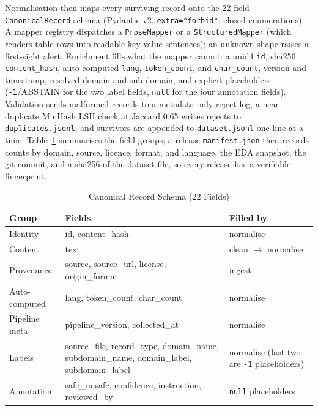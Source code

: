 \documentclass[conference]{IEEEtran}
\begin{document}
Normalisation then maps every surviving record onto the 22-field
\texttt{CanonicalRecord} schema (Pydantic v2, \texttt{extra="forbid"},
closed enumerations). A mapper registry dispatches a \texttt{ProseMapper}
or a \texttt{StructuredMapper} (which renders table rows into readable
key-value sentences); an unknown shape raises a first-sight alert.
Enrichment fills what the mapper cannot: a uuid4 \texttt{id}, sha256
\texttt{content\_hash}, auto-computed \texttt{lang}, \texttt{token\_count},
and \texttt{char\_count}, version and timestamp, resolved domain and
sub-domain, and explicit placeholders (\texttt{-1}/ABSTAIN for the two
label fields, \texttt{null} for the four annotation fields). Validation
sends malformed records to a metadata-only reject log, a near-duplicate
MinHash LSH check at Jaccard 0.65 writes rejects to
\texttt{duplicates.jsonl}, and survivors are appended to
\texttt{dataset.jsonl} one line at a time. Table~\ref{tab:schema}
summarises the field groups; a release \texttt{manifest.json} then
records counts by domain, source, licence, format, and language, the EDA
snapshot, the git commit, and a sha256 of the dataset file, so every
release has a verifiable fingerprint.

\begin{table}[t]
\caption{Canonical Record Schema (22 Fields)}
\label{tab:schema}
\centering
\renewcommand{\arraystretch}{1.05}
\begin{tabular}{@{}p{1.7cm}p{1.5cm}p{4.0cm}@{}}
\toprule
\textbf{Group} & \textbf{Fields} & \textbf{Filled by} \\
\midrule
Identity & id, content\_hash & normalise \\
Content & text & clean $\rightarrow$ normalise \\
Provenance & source, source\_url, license, origin\_format & ingest \\
Auto-computed & lang, token\_count, char\_count & normalise \\
Pipeline meta & pipeline\_\allowbreak version, collected\_at & normalise \\
Labels & source\_file, record\_type, domain\_name, subdomain\_name, domain\_label, subdomain\_label & normalise (last two are \texttt{-1} placeholders) \\
Annotation & safe\_unsafe, confidence, instruction, reviewed\_by & \texttt{null} placeholders \\
\bottomrule
\end{tabular}
\end{table}
\end{document}
